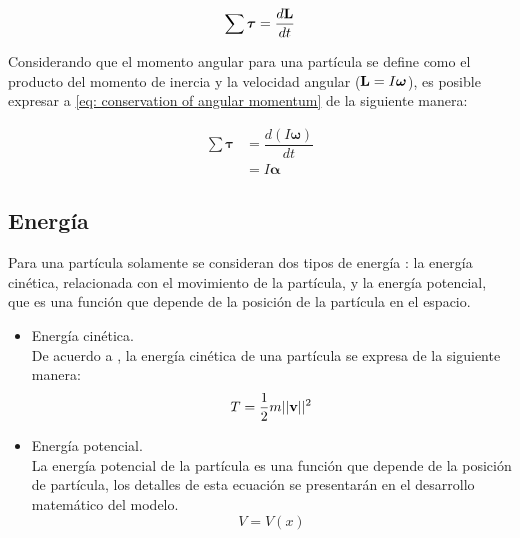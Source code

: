 \begin{equation}
  \sum \boldsymbol{\tau} = \dfrac{d \bold{L}}{dt}
  \label{eq: conservation of angular momentum}
\end{equation}

Considerando que el momento angular para una partícula
se define como el producto del momento de inercia 
y la velocidad angular
($\bold{L} = I \boldsymbol{\omega}$), es posible 
expresar a \eqref{eq: conservation of angular momentum}
de la siguiente manera:

\begin{equation}
 \begin{split}
  \sum \boldsymbol{\tau} &= \dfrac{d (I \boldsymbol{\omega})}{dt} \\
  &= I \boldsymbol{\alpha}
 \end{split}
 \label{eq: angular momentum and torque}
\end{equation}

\subsection{Energía}

Para una partícula solamente se consideran dos tipos de 
energía \cite{susskind2014theoretical}: la energía cinética,
relacionada con el movimiento de la partícula, y la 
energía potencial, que es una función que depende de la 
posición de la partícula en el espacio.

\begin{itemize}
 \item Energía cinética.\\
 De acuerdo a \cite{díaz20183d}, 
 la energía cinética de una partícula se expresa de 
 la siguiente manera: 
 \begin{equation}
  T = \dfrac{1}{2} m ||\bold{v}||^2
  \label{eq: kinetic energy}
 \end{equation}

 
 \item Energía potencial.\\
 La energía potencial de la partícula es una función 
 que depende de la posición de partícula, los detalles de esta 
 ecuación se presentarán en el desarrollo matemático
 del modelo.
 \begin{equation}
    V = V(x)
  \label{eq: potential energy}
 \end{equation}

\end{itemize}

